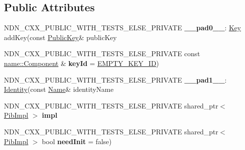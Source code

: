 \subsection*{Public Attributes}
\begin{DoxyCompactItemize}
\item 
N\+D\+N\+\_\+\+C\+X\+X\+\_\+\+P\+U\+B\+L\+I\+C\+\_\+\+W\+I\+T\+H\+\_\+\+T\+E\+S\+T\+S\+\_\+\+E\+L\+S\+E\+\_\+\+P\+R\+I\+V\+A\+TE {\bfseries \+\_\+\+\_\+pad0\+\_\+\+\_\+}\+: \hyperlink{classndn_1_1security_1_1Key}{Key} add\+Key(const \hyperlink{classndn_1_1PublicKey}{Public\+Key}\& public\+Key\hypertarget{classndn_1_1security_1_1Identity_a9e8b2c3b5c2434c685f099bec64def1d}{}\label{classndn_1_1security_1_1Identity_a9e8b2c3b5c2434c685f099bec64def1d}

\item 
N\+D\+N\+\_\+\+C\+X\+X\+\_\+\+P\+U\+B\+L\+I\+C\+\_\+\+W\+I\+T\+H\+\_\+\+T\+E\+S\+T\+S\+\_\+\+E\+L\+S\+E\+\_\+\+P\+R\+I\+V\+A\+TE const \hyperlink{classndn_1_1name_1_1Component}{name\+::\+Component} \& {\bfseries key\+Id} = \hyperlink{classndn_1_1security_1_1Identity_a4cbc752ea1f032e469cd886d6ba6ed96}{E\+M\+P\+T\+Y\+\_\+\+K\+E\+Y\+\_\+\+ID})\hypertarget{classndn_1_1security_1_1Identity_a943c06b36ccaa5eda2cf47334d2a9e68}{}\label{classndn_1_1security_1_1Identity_a943c06b36ccaa5eda2cf47334d2a9e68}

\item 
N\+D\+N\+\_\+\+C\+X\+X\+\_\+\+P\+U\+B\+L\+I\+C\+\_\+\+W\+I\+T\+H\+\_\+\+T\+E\+S\+T\+S\+\_\+\+E\+L\+S\+E\+\_\+\+P\+R\+I\+V\+A\+TE {\bfseries \+\_\+\+\_\+pad1\+\_\+\+\_\+}\+: \hyperlink{classndn_1_1security_1_1Identity}{Identity}(const \hyperlink{classndn_1_1Name}{Name}\& identity\+Name\hypertarget{classndn_1_1security_1_1Identity_ab651f985e4891e4a9ef404dba44ffd4d}{}\label{classndn_1_1security_1_1Identity_ab651f985e4891e4a9ef404dba44ffd4d}

\item 
N\+D\+N\+\_\+\+C\+X\+X\+\_\+\+P\+U\+B\+L\+I\+C\+\_\+\+W\+I\+T\+H\+\_\+\+T\+E\+S\+T\+S\+\_\+\+E\+L\+S\+E\+\_\+\+P\+R\+I\+V\+A\+TE shared\+\_\+ptr$<$ \hyperlink{classndn_1_1security_1_1PibImpl}{Pib\+Impl} $>$ {\bfseries impl}\hypertarget{classndn_1_1security_1_1Identity_a91f6ff14f256420ceb087b2a342267b6}{}\label{classndn_1_1security_1_1Identity_a91f6ff14f256420ceb087b2a342267b6}

\item 
N\+D\+N\+\_\+\+C\+X\+X\+\_\+\+P\+U\+B\+L\+I\+C\+\_\+\+W\+I\+T\+H\+\_\+\+T\+E\+S\+T\+S\+\_\+\+E\+L\+S\+E\+\_\+\+P\+R\+I\+V\+A\+TE shared\+\_\+ptr$<$ \hyperlink{classndn_1_1security_1_1PibImpl}{Pib\+Impl} $>$ bool {\bfseries need\+Init} = false)\hypertarget{classndn_1_1security_1_1Identity_a1ece7f485daaff50e061449594593585}{}\label{classndn_1_1security_1_1Identity_a1ece7f485daaff50e061449594593585}

\end{DoxyCompactItemize}
